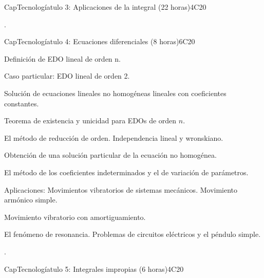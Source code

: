 \begin{syllabus}
\begin{unit}{CapTecnologíatulo 3: Aplicaciones de la integral (22 horas)}{}{}{4}{C20}
   \begin{learningoutcomes}
      \item .
   \end{learningoutcomes}
\end{unit}

\begin{unit}{CapTecnologíatulo 4: Ecuaciones diferenciales (8 horas)}{}{}{6}{C20}


\begin{topics}
      \item Definición de EDO lineal de orden n. 
      \item Caso particular: EDO lineal de orden 2.
      \item Solución de ecuaciones lineales no homogéneas lineales con coeficientes constantes.
      \item Teorema de existencia y unicidad para EDOs de orden $n$.
      \item El método de reducción de orden. Independencia lineal y wronskiano.
      \item Obtención de una solución particular de la ecuación no homogénea.
      \item El método de los coeficientes indeterminados y el de variación de parámetros. 
      \item Aplicaciones: Movimientos vibratorios de sistemas mecánicos. Movimiento armónico 				simple. 
      \item  Movimiento vibratorio con amortiguamiento.
      \item El fenómeno de resonancia. Problemas de circuitos eléctricos y el péndulo simple.
   \end{topics}

   \begin{learningoutcomes}
      \item .
   \end{learningoutcomes}
\end{unit}

\begin{unit}{CapTecnologíatulo 5: Integrales impropias (6 horas)}{}{}{4}{C20}



\end{unit}
\end{syllabus}
